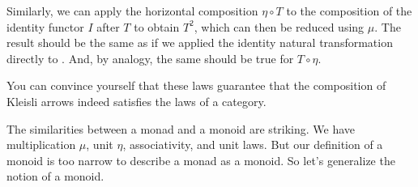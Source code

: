 \begin{figure}[H]
\centering
{}
\end{figure}

\noindent
Similarly, we can apply the horizontal composition $\eta \circ T$ to the
composition of the identity functor $I$ after $T$ to
obtain $T^2$, which can then be reduced using $\mu$. The
result should be the same as if we applied the identity natural
transformation directly to . And, by analogy, the same should
be true for $T \circ \eta$.

\begin{figure}[H]
\centering
{}
\end{figure}

\noindent
You can convince yourself that these laws guarantee that the composition
of Kleisli arrows indeed satisfies the laws of a category.

The similarities between a monad and a monoid are striking. We have
multiplication $\mu$, unit $\eta$, associativity, and unit laws. But our
definition of a monoid is too narrow to describe a monad as a monoid. So
let's generalize the notion of a monoid.


